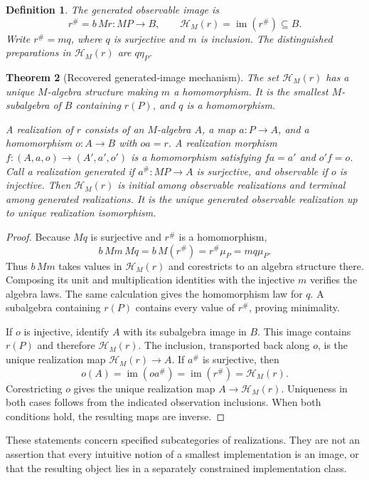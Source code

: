 \documentclass[11pt]{article}
\newtheorem{theorem}{Theorem}[section]
\newtheorem{definition}[theorem]{Definition}
\DeclareMathOperator{\im}{im}
\newcommand{\HH}{\mathcal H}
\begin{document}
\begin{definition}
The \emph{generated observable image} is
\[
 r^\#=b\,Mr:MP\longrightarrow B,
 \qquad \HH_M(r)=\im(r^\#)\subseteq B.
\]
Write $r^\#=mq$, where $q$ is surjective and $m$ is inclusion. The distinguished preparations in $\HH_M(r)$ are $q\eta_P$.
\end{definition}

\begin{theorem}[Recovered generated-image mechanism]
The set $\HH_M(r)$ has a unique $M$-algebra structure making $m$ a homomorphism. It is the smallest $M$-subalgebra of $B$ containing $r(P)$, and $q$ is a homomorphism.

A realization of $r$ consists of an $M$-algebra $A$, a map $a:P\to A$, and a homomorphism $o:A\to B$ with $oa=r$. A realization morphism $f:(A,a,o)\to(A',a',o')$ is a homomorphism satisfying $fa=a'$ and $o'f=o$. Call a realization \emph{generated} if $a^\#:MP\to A$ is surjective, and \emph{observable} if $o$ is injective. Then $\HH_M(r)$ is initial among observable realizations and terminal among generated realizations. It is the unique generated observable realization up to unique realization isomorphism.
\end{theorem}

\begin{proof}
Because $Mq$ is surjective and $r^\#$ is a homomorphism,
\[
 b\,Mm\,Mq=b\,M(r^\#)=r^\#\mu_P=mq\mu_P.
\]
Thus $b\,Mm$ takes values in $\HH_M(r)$ and corestricts to an algebra structure there. Composing its unit and multiplication identities with the injective $m$ verifies the algebra laws. The same calculation gives the homomorphism law for $q$. A subalgebra containing $r(P)$ contains every value of $r^\#$, proving minimality.

If $o$ is injective, identify $A$ with its subalgebra image in $B$. This image contains $r(P)$ and therefore $\HH_M(r)$. The inclusion, transported back along $o$, is the unique realization map $\HH_M(r)\to A$. If $a^\#$ is surjective, then
\[
 o(A)=\im(oa^\#)=\im(r^\#)=\HH_M(r).
\]
Corestricting $o$ gives the unique realization map $A\to\HH_M(r)$. Uniqueness in both cases follows from the indicated observation inclusions. When both conditions hold, the resulting maps are inverse.
\end{proof}

These statements concern specified subcategories of realizations. They are not an assertion that every intuitive notion of a smallest implementation is an image, or that the resulting object lies in a separately constrained implementation class.
\end{document}
